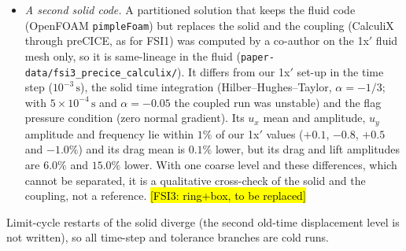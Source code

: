 \begin{itemize}
	\item \emph{A second solid code.} A partitioned solution that keeps the fluid code (OpenFOAM \texttt{pimpleFoam}) but replaces the solid and the coupling (CalculiX through preCICE, as for FSI1) was computed by a co-author on the 1x$'$ fluid mesh only, so it is same-lineage in the fluid (\texttt{paper-data/fsi3\_precice\_calculix/}).
	It differs from our 1x$'$ set-up in the time step ($10^{-3}\,\mathrm{s}$), the solid time integration (Hilber--Hughes--Taylor, $\alpha = -1/3$; with $5\times10^{-4}\,\mathrm{s}$ and $\alpha = -0.05$ the coupled run was unstable) and the flag pressure condition (zero normal gradient).
	Its $u_x$ mean and amplitude, $u_y$ amplitude and frequency lie within $1\%$ of our 1x$'$ values ($+0.1$, $-0.8$, $+0.5$ and $-1.0\%$) and its drag mean is $0.1\%$ lower, but its drag and lift amplitudes are $6.0\%$ and $15.0\%$ lower.
	With one coarse level and these differences, which cannot be separated, it is a qualitative cross-check of the solid and the coupling, not a reference. \hl{[FSI3: ring+box, to be replaced]}
\end{itemize}
Limit-cycle restarts of the solid diverge (the second old-time displacement level is not written), so all time-step and tolerance branches are cold runs.

